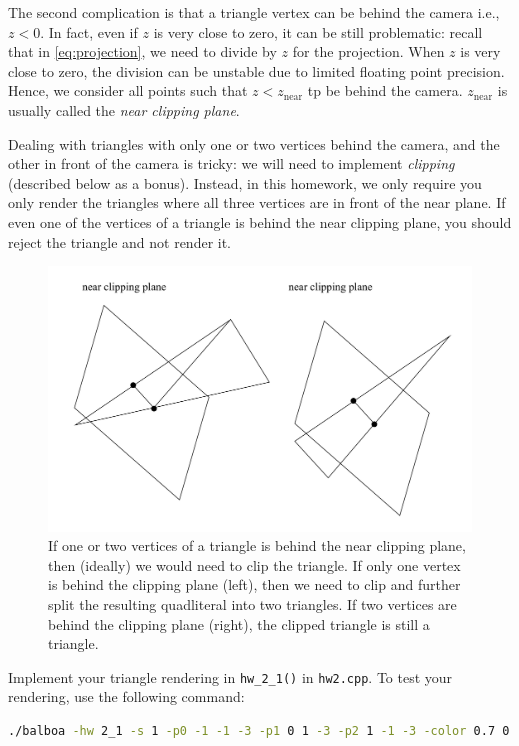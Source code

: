 The second complication is that a triangle vertex can be behind the camera i.e., $z < 0$. In fact, even if $z$ is very close to zero, it can be still problematic: recall that in \cref{eq:projection}, we need to divide by $z$ for the projection. When $z$ is very close to zero, the division can be unstable due to limited floating point precision. Hence, we consider all points such that $z < z_{\text{near}}$ tp be behind the camera. $z_{\text{near}}$ is usually called the \emph{near clipping plane}.

Dealing with triangles with only one or two vertices behind the camera, and the other in front of the camera is tricky: we will need to implement \emph{clipping} (described below as a bonus). Instead, in this homework, we only require you only render the triangles where all three vertices are in front of the near plane. If even one of the vertices of a triangle is behind the near clipping plane, you should reject the triangle and not render it.

\begin{figure}[h]
    \centering
    \includegraphics[width=0.7\linewidth]{imgs/triangle_clipping.pdf}
    \caption{If one or two vertices of a triangle is behind the near clipping plane, then (ideally) we would need to clip the triangle. If only one vertex is behind the clipping plane (left), then we need to clip and further split the resulting quadliteral into two triangles. If two vertices are behind the clipping plane (right), the clipped triangle is still a triangle.}
    \label{fig:triangle_clipping}
\end{figure}

Implement your triangle rendering in \lstinline{hw_2_1()} in \lstinline{hw2.cpp}. To test your rendering, use the following command:
\begin{lstlisting}[language=bash]
  ./balboa -hw 2_1 -s 1 -p0 -1 -1 -3 -p1 0 1 -3 -p2 1 -1 -3 -color 0.7 0.3 0.4 -znear 1e-6
\end{lstlisting}

